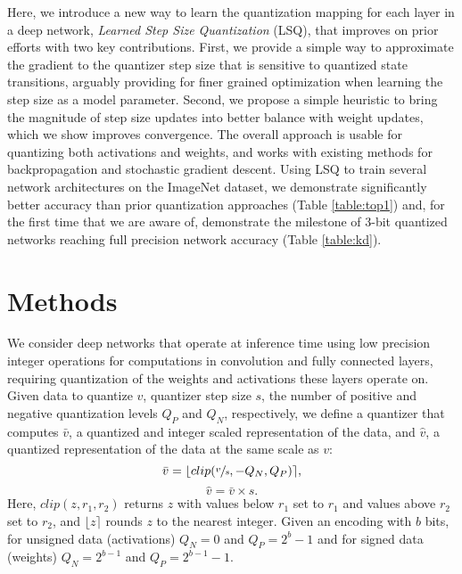 \documentclass{article}
\begin{document}
Here, we introduce a new way to learn the quantization mapping for each layer in a deep network, \textit{Learned Step Size Quantization} (LSQ), that improves on prior efforts with two key contributions.
First, we provide a simple way to approximate the gradient to the quantizer step size that is sensitive to quantized state transitions, 
arguably providing for finer grained optimization when learning the step size as a model parameter.
Second, we propose a simple heuristic to bring the magnitude of step size updates into better balance with weight updates, which we show improves convergence.
The overall approach is usable for quantizing both activations and weights, and works with existing methods for backpropagation and stochastic gradient descent.
Using LSQ to train several network architectures on the ImageNet dataset, we demonstrate 
significantly better accuracy than prior quantization approaches (Table \ref{table:top1}) and,
for the first time that we are aware of, demonstrate the milestone of 3-bit quantized networks reaching full precision network accuracy (Table \ref{table:kd}).



\section{Methods}

We consider deep networks that operate at inference time using low precision integer operations for computations in convolution and fully connected layers, requiring quantization of the weights and activations these layers operate on.
Given data to quantize $v$, quantizer step size $s$, the number of positive and negative quantization levels $Q_P$ and $Q_N$, respectively, we define a quantizer that computes $\bar{v}$, a quantized and integer scaled representation of the data, and $\hat{v}$, a quantized representation of the data at the same scale as $v$:
\begin{equation}
	\label{eq:quantization1}
	\bar{v} = \lfloor clip( \sfrac{v}{s}, -Q_N, Q_P) \rceil,
\end{equation}
\begin{equation}
	\label{eq:quantization2}
	\hat{v} = \bar{v} \times s.
\end{equation}
Here, $clip(z,r_1,r_2)$ returns $z$ with values below $r_1$ set to $r_1$ and values above $r_2$ set to $r_2$, and $\lfloor z \rceil$ rounds $z$ to the nearest integer.
Given an encoding with $b$ bits, for unsigned data (activations) $Q_N=0$ and $Q_P=2^b-1$ and for signed data (weights) $Q_N=2^{b-1}$ and $Q_P=2^{b-1}-1$. 
\end{document}
